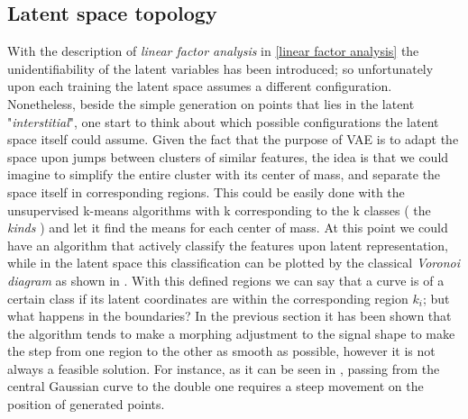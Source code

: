 \subsection{Latent space topology}
With the description of \textit{linear factor analysis} in \cref{linear factor analysis} the unidentifiability of the latent variables has been introduced; so unfortunately upon each training the latent space assumes a different configuration. 
Nonetheless, beside the simple generation on points that lies in the latent "\textit{interstitial}", one start to think about which possible configurations the latent space itself could assume. Given the fact that the purpose of \acs{VAE} is to adapt the space upon jumps between clusters of similar features, the idea is that we could imagine to simplify the entire cluster with its center of mass, and separate the space itself in corresponding regions. This could be easily done with the unsupervised k-means algorithms with k corresponding to the k classes ( the \textit{kinds} ) and let it find the means for each center of mass. At this point we could have an algorithm that actively classify the features upon latent representation, while in the latent space this classification can be plotted by the classical \textit{Voronoi diagram} as shown in \Figure{\ref{fig:voronoi_ls}}. With this defined regions we can say that a curve is of a certain class if its latent coordinates are within the corresponding region $k_i$; but what happens in the boundaries? In the previous section it has been shown that the algorithm tends to make a morphing adjustment to the signal shape to make the step from one region to the other as smooth as possible, however it is not always a feasible solution. For instance, as it can be seen in \Figure{\ref{fig:step1_morph_gn4}}, passing from the central Gaussian curve to the double one requires a steep movement on the position of generated points.

